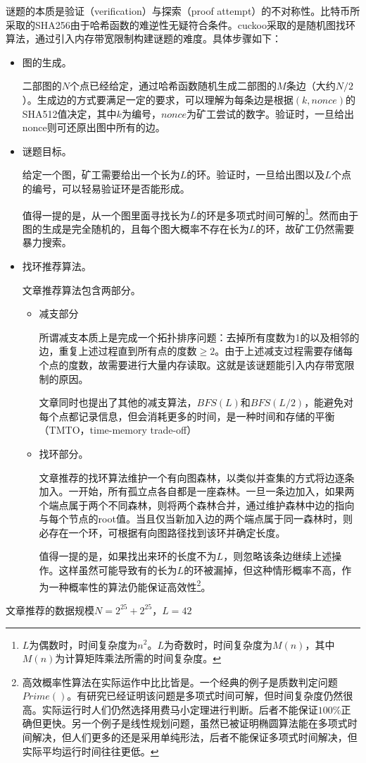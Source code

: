 谜题的本质是验证（verification）与探索（proof attempt）的不对称性。比特币所采取的SHA256由于哈希函数的难逆性无疑符合条件。cuckoo采取的是随机图找环算法，通过引入内存带宽限制构建谜题的难度。具体步骤如下：
\begin{itemize}
	\item 图的生成。
	
	二部图的$N$个点已经给定，通过哈希函数随机生成二部图的$M$条边（大约$N/2$）。生成边的方式要满足一定的要求，可以理解为每条边是根据$(k,nonce)$的SHA512值决定，其中$k$为编号，$nonce$为矿工尝试的数字。验证时，一旦给出nonce则可还原出图中所有的边。
	
	\item 谜题目标。
	
	给定一个图，矿工需要给出一个长为$L$的环。验证时，一旦给出图以及$L$个点的编号，可以轻易验证环是否能形成。
	
	值得一提的是，从一个图里面寻找长为$L$的环是多项式时间可解的\footnote{$L$为偶数时，时间复杂度为$n^2$。$L$为奇数时，时间复杂度为$M(n)$，其中$M(n)$为计算矩阵乘法所需的时间复杂度。}。然而由于图的生成是完全随机的，且每个图大概率不存在长为$L$的环，故矿工仍然需要暴力搜索。
	
	\item 找环推荐算法。
	
    文章推荐算法包含两部分。
    \begin{itemize}
    	\item 减支部分
    	
    	所谓减支本质上是完成一个拓扑排序问题：去掉所有度数为1的以及相邻的边，重复上述过程直到所有点的度数$\geq 2$。由于上述减支过程需要存储每个点的度数，故需要进行大量内存读取。这就是该谜题能引入内存带宽限制的原因。
    	
    	文章同时也提出了其他的减支算法，$BFS(L)$和$BFS(L/2)$，能避免对每个点都记录信息，但会消耗更多的时间，是一种时间和存储的平衡（TMTO，time-memory trade-off）
    	
    	\item 找环部分。
    	
    	文章推荐的找环算法维护一个有向图森林，以类似并查集的方式将边逐条加入。一开始，所有孤立点各自都是一座森林。一旦一条边加入，如果两个端点属于两个不同森林，则将两个森林合并，通过维护森林中边的指向与每个节点的root值。当且仅当新加入边的两个端点属于同一森林时，则必存在一个环，可根据有向图路径找到该环并确定长度。
    	
    	值得一提的是，如果找出来环的长度不为$L$，则忽略该条边继续上述操作。这样虽然可能导致有的长为$L$的环被漏掉，但这种情形概率不高，作为一种概率性的算法仍能保证高效性\footnote{高效概率性算法在实际运作中比比皆是。一个经典的例子是质数判定问题$Prime()$。有研究已经证明该问题是多项式时间可解，但时间复杂度仍然很高。实际运行时人们仍然选择用费马小定理进行判断。后者不能保证$100\%$正确但更快。另一个例子是线性规划问题，虽然已被证明椭圆算法能在多项式时间解决，但人们更多的还是采用单纯形法，后者不能保证多项式时间解决，但实际平均运行时间往往更低。}。
    \end{itemize}
\end{itemize}	
文章推荐的数据规模$N=2^{25}+2^{25}$，$L=42$

